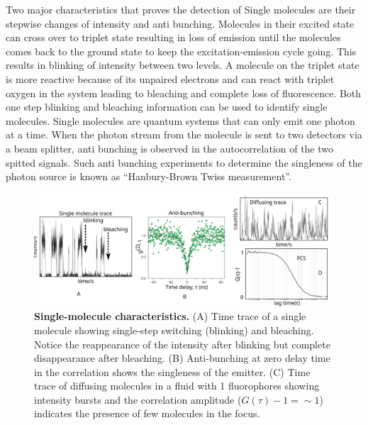 \documentclass[11pt,a4paper,onecolumn]{article}
\begin{document}
Two major characteristics that proves the detection of Single molecules are their stepwise changes of intensity and anti bunching.
Molecules in their excited state can cross over to triplet state resulting in loss of emission until the molecules comes back to the ground state to keep the excitation-emission cycle going.
This results in blinking of intensity between two levels.
A molecule on the triplet state is more reactive because of its unpaired electrons and can react with triplet oxygen in the system leading to bleaching and complete loss of fluorescence.
Both one step blinking and bleaching information can be used to identify single molecules.
Single molecules are quantum systems that can only emit one photon at a time.
When the photon stream from the molecule is sent to two detectors via a beam splitter, anti bunching is observed in the autocorrelation of the two spitted signals.
Such anti bunching experiments to determine the singleness of the photon source is known as ``Hanbury-Brown Twiss  measurement''.
\begin{figure}
	\centering
	\includegraphics[width=\textwidth]{SM_characteristics}
	\caption{\textbf{Single-molecule characteristics.}
	(A) Time trace of a single molecule showing single-step switching (blinking) and bleaching.
	Notice the reappearance of the intensity after blinking but complete disappearance after bleaching.
	(B) Anti-bunching at zero delay time in the correlation shows the singleness of the emitter.\cite{chu2016a}
	(C) Time trace of diffusing molecules in a fluid with \SI{1}{\nM} fluorophores showing intensity bursts and the correlation amplitude ($G(\tau)-1={\sim}1$) indicates the presence of few molecules in the focus.}
	\label{fig:SM_characteristics}
\end{figure}
\end{document}
